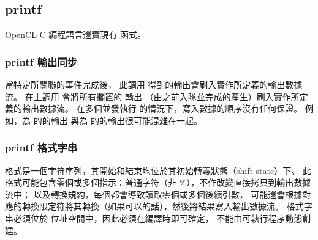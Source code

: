\subsection{printf}

OpenCL C 編程語言還實現有  函式。

{}

\subsubsection{printf 輸出同步}

當特定所關聯的事件完成後，
此調用  得到的輸出會刷入實作所定義的輸出數據流。
在上調用  會將所有擱置的  輸出
（由之前入隊並完成的產生）刷入實作所定義的輸出數據流。
在多個並發執行  的情況下，寫入數據的順序沒有任何保證。
例如，為 的的輸出
與為 的的輸出很可能混雜在一起。

\subsubsection{printf 格式字串}

格式是一個字符序列，其開始和結束均位於其初始轉義狀態（shift state）下。
此格式可能包含零個或多個指示：普通字符（非 \%），不作改變直接拷貝到輸出數據流中；
以及轉換規約，每個都會導致讀取零個或多個後續引數，
可能還會根據對應的轉換限定符將其轉換（如果可以的話），然後將結果寫入輸出數據流。
格式字串必須位於  位址空間中，因此必須在編譯時即可確定，
不能由可執行程序動態創建。
